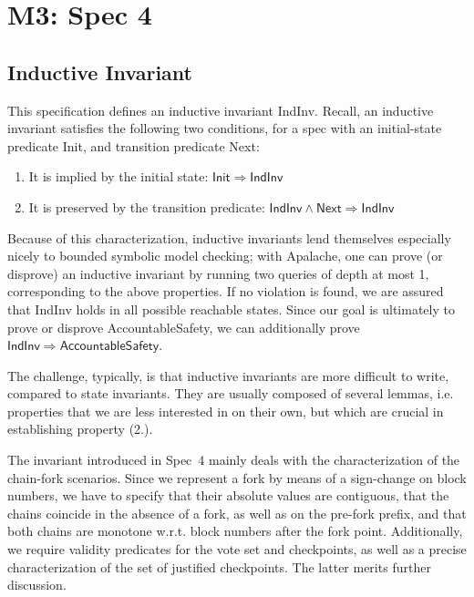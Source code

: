 
\section{M3: Spec 4}

\subsection{Inductive Invariant} 
This specification defines an inductive invariant \textsf{IndInv}. Recall, an inductive invariant satisfies the following two conditions, for a spec with an initial-state predicate \textsf{Init}, and transition predicate \textsf{Next}:
\begin{enumerate}
	\item It is implied by the initial state: $\mathsf{Init} \Rightarrow \mathsf{IndInv}$
	\item It is preserved by the transition predicate: $\mathsf{IndInv} \land \mathsf{Next} \Rightarrow \mathsf{IndInv}$
\end{enumerate}
Because of this characterization, inductive invariants lend themselves especially nicely to bounded symbolic model checking; with Apalache, one can prove (or disprove) an inductive invariant by running two queries of depth at most 1, corresponding to the above properties.
If no violation is found, we are assured that \textsf{IndInv} holds in all possible reachable states.
Since our goal is ultimately to prove or disprove \textsf{AccountableSafety}, we can additionally prove $\textsf{IndInv} \Rightarrow \mathsf{AccountableSafety}$.

The challenge, typically, is that inductive invariants are more difficult to write, compared to state invariants.
They are usually composed of several lemmas, i.e. properties that we are less interested in on their own, but which are crucial in establishing property (2.).

The invariant introduced in Spec~4 mainly deals with the characterization of the chain-fork scenarios. 
Since we represent a fork by means of a sign-change on block numbers, we have to specify that their absolute values are contiguous, that the chains coincide in the absence of a fork, as well as on the pre-fork prefix, and that both chains are monotone w.r.t. block numbers after the fork point.
Additionally, we require validity predicates for the vote set and checkpoints, as well as a precise characterization of the set of justified checkpoints. The latter merits further discussion.

